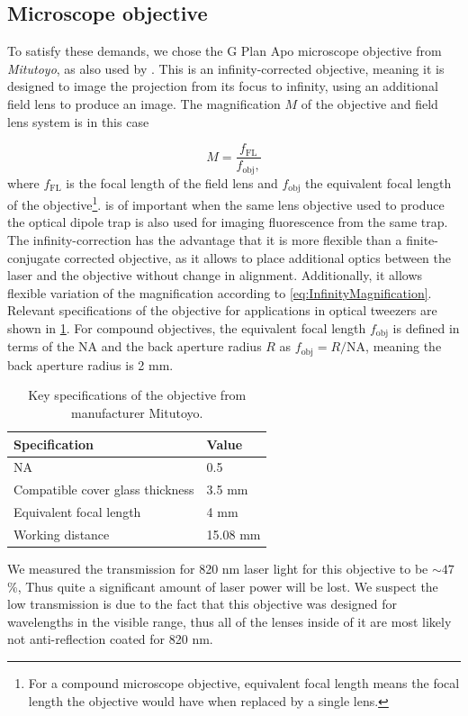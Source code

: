 \subsection{Microscope objective}

To satisfy these demands, we chose the G Plan Apo microscope objective from \textit{Mitutoyo}, as also used by \cite{Ebadi2021,Manuel2016}. 
This is an infinity-corrected objective, meaning it is designed to image the projection from its focus to infinity, using an additional field lens to produce an image.
The magnification $M$ of the objective and field lens system is in this case 

\begin{equation}\label{eq:InfinityMagnification}
	M = \frac{
		f_{\text{FL}}
	}{
		f_{\text{obj}},
	}
\end{equation}
where $f_{\text{FL}}$ is the focal length of the field lens and $f_{\text{obj}}$ the equivalent focal length of the objective\footnote{For a compound microscope objective, equivalent focal length means the focal length the objective would have when replaced by a single lens.}.
 is of important when the same lens objective used to produce the optical dipole trap is also used for imaging fluorescence from the same trap.
The infinity-correction has the advantage that it is more flexible than a finite-conjugate corrected objective, as it allows to place additional optics between the laser and the objective without change in alignment.
Additionally, it allows flexible variation of the magnification according to \cref{eq:InfinityMagnification}.
Relevant specifications of the objective for applications in optical tweezers are shown in \cref{table:MitutoyoSpecs}. 
For compound objectives, the equivalent focal length $f_{\text{obj}}$ is defined in terms of the \ac{NA} and the back aperture radius $R$ as $f_{\text{obj}} = R / \text{NA}$, meaning the back aperture radius is 2 mm.

\begin{table}[h]
	\centering
	\caption{Key specifications of the objective from manufacturer Mitutoyo.}
	\label{table:MitutoyoSpecs}
	\begin{tabular}{l | l}
		\textbf{Specification}          & \textbf{Value} \\ \hline 
		NA                              & 0.5            \\ \hline
		Compatible cover glass thickness& 3.5 mm         \\ \hline
		Equivalent focal length         & 4 mm           \\ \hline
		Working distance                & 15.08 mm      
	\end{tabular}
\end{table}
\noindent We measured the transmission for 820 nm laser light for this objective to be $\sim 47$\%, 
Thus quite a significant amount of laser power will be lost. 
We suspect the low transmission is due to the fact that this objective was designed for wavelengths in the visible range, thus all of the lenses inside of it are most likely not anti-reflection coated for 820 nm.

